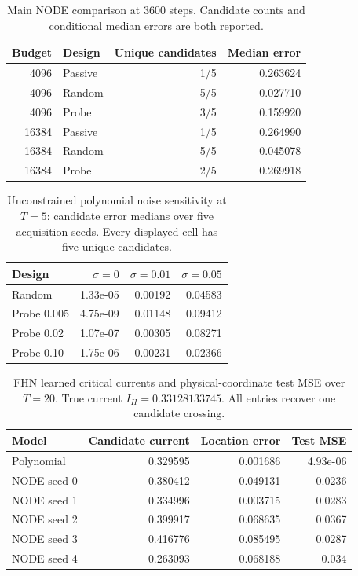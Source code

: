 \begin{table}[tb]
\centering\small
\caption{Main NODE comparison at 3600 steps. Candidate counts and conditional median errors are both reported.}\label{tab:main}
\begin{tabular}{rlrr}\toprule
Budget & Design & Unique candidates & Median error \\
\midrule
4096 & Passive & 1/5 & 0.263624 \\
4096 & Random & 5/5 & 0.027710 \\
4096 & Probe & 3/5 & 0.159920 \\
16384 & Passive & 1/5 & 0.264990 \\
16384 & Random & 5/5 & 0.045078 \\
16384 & Probe & 2/5 & 0.269918 \\
\bottomrule\end{tabular}
\end{table}
\begin{table}[tb]
\centering\small
\caption{Unconstrained polynomial noise sensitivity at $T=5$: candidate error medians over five acquisition seeds. Every displayed cell has five unique candidates.}\label{tab:noise}
\begin{tabular}{lrrr}\toprule
Design & $\sigma=0$ & $\sigma=0.01$ & $\sigma=0.05$ \\
\midrule
Random & 1.33e-05 & 0.00192 & 0.04583\\
Probe 0.005 & 4.75e-09 & 0.01148 & 0.09412\\
Probe 0.02 & 1.07e-07 & 0.00305 & 0.08271\\
Probe 0.10 & 1.75e-06 & 0.00231 & 0.02366\\
\bottomrule\end{tabular}
\end{table}
\begin{table}[tb]
\centering\small
\caption{FHN learned critical currents and physical-coordinate test MSE over $T=20$. True current $I_H=0.33128133745$. All entries recover one candidate crossing.}\label{tab:fhn}
\begin{tabular}{lrrr}\toprule
Model & Candidate current & Location error & Test MSE \\
\midrule
Polynomial & 0.329595 & 0.001686 & 4.93e-06 \\
NODE seed 0 & 0.380412 & 0.049131 & 0.0236 \\
NODE seed 1 & 0.334996 & 0.003715 & 0.0283 \\
NODE seed 2 & 0.399917 & 0.068635 & 0.0367 \\
NODE seed 3 & 0.416776 & 0.085495 & 0.0287 \\
NODE seed 4 & 0.263093 & 0.068188 & 0.034 \\
\bottomrule\end{tabular}
\end{table}
